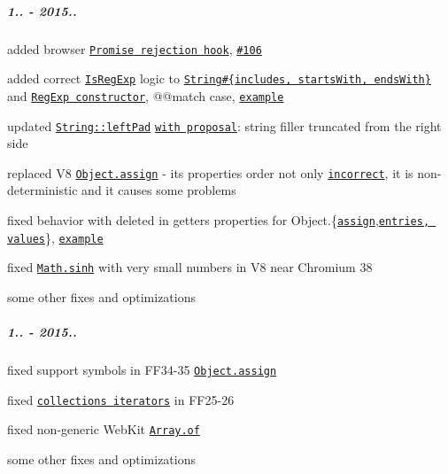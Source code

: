 \subparagraph*{1.. -\/ 2015..}


\begin{DoxyItemize}
\item added browser \href{#unhandled-rejection-tracking}{\tt {\ttfamily Promise} rejection hook}, \href{https://github.com/zloirock/core-js/issues/106}{\tt \#106}
\item added correct \href{http://www.ecma-international.org/ecma-262/6.0/#sec-isregexp}{\tt {\ttfamily Is\+Reg\+Exp}} logic to \href{https://github.com/zloirock/core-js/#ecmascript-6-string}{\tt {\ttfamily String\#\{includes, starts\+With, ends\+With\}}} and \href{https://github.com/zloirock/core-js/#ecmascript-6-regexp}{\tt {\ttfamily Reg\+Exp} constructor}, {\ttfamily @@match} case, \href{https://developer.mozilla.org/en-US/docs/Web/JavaScript/Reference/Global_Objects/Symbol/match#Disabling_the_isRegExp_check}{\tt example}
\item updated \href{https://github.com/zloirock/core-js/#ecmascript-7-proposals}{\tt {\ttfamily String\+::left\+Pad}} \href{https://github.com/ljharb/proposal-string-pad-left-right/issues/6}{\tt with proposal}\+: string filler truncated from the right side
\item replaced V8 \href{https://github.com/zloirock/core-js/#ecmascript-6-object}{\tt {\ttfamily Object.\+assign}} -\/ its properties order not only \href{https://github.com/sindresorhus/object-assign/issues/22}{\tt incorrect}, it is non-\/deterministic and it causes some problems
\item fixed behavior with deleted in getters properties for {\ttfamily Object.\{}\href{https://github.com/zloirock/core-js/#ecmascript-6-object}{\tt {\ttfamily assign}}{\ttfamily ,}\href{https://github.com/zloirock/core-js/#ecmascript-7-proposals}{\tt {\ttfamily entries, values}}{\ttfamily \}}, \href{http://goo.gl/iQE01c}{\tt example}
\item fixed \href{https://github.com/zloirock/core-js/#ecmascript-6-math}{\tt {\ttfamily Math.\+sinh}} with very small numbers in V8 near Chromium 38
\item some other fixes and optimizations
\end{DoxyItemize}

\subparagraph*{1.. -\/ 2015..}


\begin{DoxyItemize}
\item fixed support symbols in F\+F34-\/35 \href{https://github.com/zloirock/core-js/#ecmascript-6-object}{\tt {\ttfamily Object.\+assign}}
\item fixed \href{https://github.com/zloirock/core-js/#ecmascript-6-iterators}{\tt collections iterators} in F\+F25-\/26
\item fixed non-\/generic Web\+Kit \href{https://github.com/zloirock/core-js/#ecmascript-6-array}{\tt {\ttfamily Array.\+of}}
\item some other fixes and optimizations
\end{DoxyItemize}

